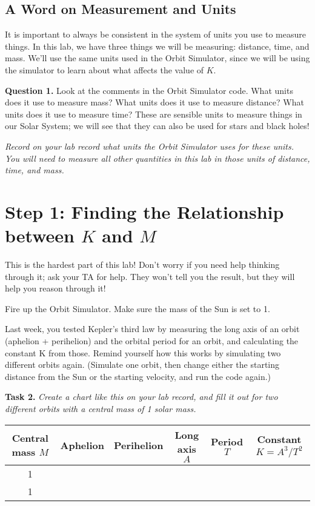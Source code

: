 \documentclass[11pt]{article}
\begin{document}
\subsection{A Word on Measurement and Units}

It is important to always be consistent in the system of units you use to measure things. In this lab, we have three things we will be measuring: distance, time, and mass. We’ll use the same units used in the Orbit Simulator, since we will be using the simulator to learn about what affects the value of $K$.

\textbf{Question 1.} Look at the comments in the Orbit Simulator code. What units does it use to measure mass? What units does it use to measure distance? What units does it use to measure time? These are sensible units to measure things in our Solar System; we will see that they can also be used for stars and black holes!

{\it Record on your lab record what units the Orbit Simulator uses for these units. You will need to measure all other quantities in this lab in those units of distance, time, and mass.}

\section{Step 1: Finding the Relationship between $K$ and $M$}

This is the hardest part of this lab! Don’t worry if you need help thinking through it; ask your TA for help. They won't tell you the result, but they will help you reason through it!

Fire up the Orbit Simulator. Make sure the mass of the Sun is set to 1.

Last week, you tested Kepler’s third law by measuring the long axis of an orbit (aphelion + perihelion) and the orbital period for an orbit, and calculating the constant K from those. Remind yourself how this works by simulating two different orbits again. (Simulate one orbit, then change either the starting distance from the Sun or the starting velocity, and run the code again.) 

\bigskip


{\bf Task 2.} {\it Create a chart like this on your lab record, and fill it out for two different orbits with a central mass of 1 solar mass.}

\begin{center}
	\large
\begin{tabular}{|c|c|c|c|c|c|}
	\hline
	Central mass $M$ & Aphelion & Perihelion & Long axis $A$ & Period $T$ & Constant $K = A^3 / T^2$ \\ \hline
	1 & & & & &  \\ \hline
	1 & & & & &  \\ \hline
	
\end{tabular}

\end{center}
\end{document}
